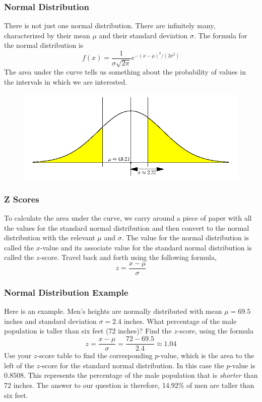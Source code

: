\documentclass[xcolor=dvipsnames]{beamer}
\begin{document}
\begin{frame}
  \frametitle{Normal Distribution}
There is not just one normal distribution. There are infinitely many,
characterized by their \alert{mean $\mu$} and their \alert{standard deviation
$\sigma$}. The formula for the normal distribution is
\begin{equation}
  \label{eq:aitoolah}
  f(x)=\frac{1}{\sigma\sqrt{2\pi}}e^{-(x-\mu)^{2}/(2\sigma^{2})}
\end{equation}
The area under the curve tells us something about the probability of
values in the intervals in which we are interested.
  \begin{figure}[h]
    \includegraphics[scale=.4]{./diagrams/qfour.png}
  \end{figure}
\end{frame}

\begin{frame}
  \frametitle{Z Scores}
To calculate the area under the curve, we carry around a piece of
paper with all the values for the \alert{standard normal distribution}
and then convert to the normal distribution with the relevant $\mu$
and $\sigma$. The value for the normal distribution is called the
\alert{$x$-value} and its associate value for the standard normal distribution
is called the \alert{$z$-score}. Travel back and forth using the following
formula,
\begin{equation}
  \label{eq:eyietohw}
  z=\frac{x-\mu}{\sigma}
\end{equation}
\end{frame}

\begin{frame}
  \frametitle{Normal Distribution Example}
Here is an example. Men's heights are normally distributed with mean
$\mu=69.5$ inches and standard deviation $\sigma=2.4$ inches. What
percentage of the male population is taller than six feet (72 inches)?
Find the $z$-score, using the formula
\begin{equation}
  \label{eq:igutheib}
  z=\frac{x-\mu}{\sigma}=\frac{72-69.5}{2.4}\approx{}1.04
\end{equation}
Use your $z$-score table to find the corresponding \alert{$p$-value},
which is the area to the left of the $z$-score for the standard normal
distribution. In this case the $p$-value is $0.8508$. This represents
the percentage of the male population that is \emph{shorter} than 72
inches. The answer to our question is therefore, 14.92\% of men are
taller than six feet.
\end{frame}
\end{document}
